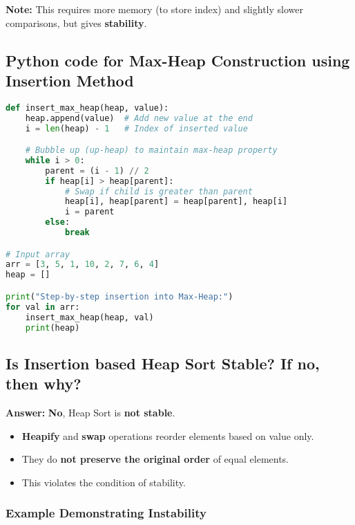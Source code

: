 \documentclass[14pt]{extarticle}
\begin{document}
\vspace{1em}

\textbf{Note:} This requires more memory (to store index) and slightly slower comparisons, but gives \textbf{stability}.



\newpage
\subsection*{Python code for Max-Heap Construction using Insertion Method}
\begin{lstlisting}[language=Python]
def insert_max_heap(heap, value):
    heap.append(value)  # Add new value at the end
    i = len(heap) - 1   # Index of inserted value

    # Bubble up (up-heap) to maintain max-heap property
    while i > 0:
        parent = (i - 1) // 2
        if heap[i] > heap[parent]:
            # Swap if child is greater than parent
            heap[i], heap[parent] = heap[parent], heap[i]
            i = parent
        else:
            break

# Input array
arr = [3, 5, 1, 10, 2, 7, 6, 4]
heap = []

print("Step-by-step insertion into Max-Heap:")
for val in arr:
    insert_max_heap(heap, val)
    print(heap)

\end{lstlisting}

\subsection*{Is Insertion based Heap Sort Stable? If no, then why?}

\textbf{Answer:} \textbf{No}, Heap Sort is \textbf{not stable}.

\begin{itemize}
    \item \textbf{Heapify} and \textbf{swap} operations reorder elements based on value only.
    \item They do \textbf{not preserve the original order} of equal elements.
    \item This violates the condition of stability.
\end{itemize}

\newpage
\subsubsection*{Example Demonstrating Instability}
\end{document}
